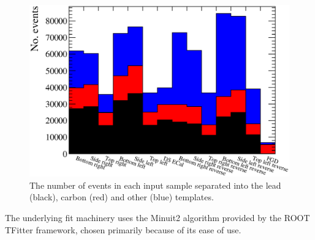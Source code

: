 \begin{figure}
  \centering
  \includegraphics[width=15cm]{images/measurement/rate_fit/MC_Templates_Nominal.eps}
  \caption{The number of events in each input sample separated into the lead (black), carbon (red) and other (blue) templates.}
  \label{fig:NominalMCTemplates}
\end{figure}
\newline
\newline
The underlying fit machinery uses the Minuit2 algorithm provided by the ROOT TFitter framework, chosen primarily because of its ease of use.


